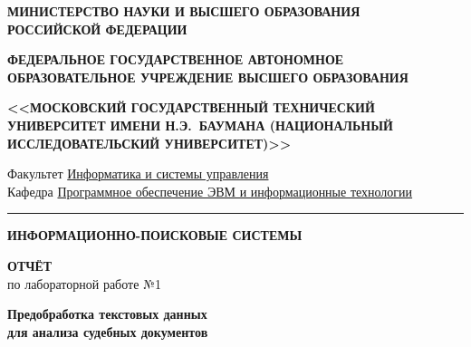 \documentclass[12pt, a4paper]{report}
\begin{document}
\setcounter{chapter}{0}

\begin{titlepage}
\thispagestyle{empty}
\begin{center}

  {\sffamily\small\bfseries МИНИСТЕРСТВО НАУКИ И ВЫСШЕГО ОБРАЗОВАНИЯ\\
  РОССИЙСКОЙ ФЕДЕРАЦИИ}

  \vspace{6pt}
  {\sffamily\small\bfseries ФЕДЕРАЛЬНОЕ ГОСУДАРСТВЕННОЕ АВТОНОМНОЕ\\
  ОБРАЗОВАТЕЛЬНОЕ УЧРЕЖДЕНИЕ ВЫСШЕГО ОБРАЗОВАНИЯ}

  \vspace{8pt}
  {\sffamily\normalsize\bfseries
 <<МОСКОВСКИЙ ГОСУДАРСТВЕННЫЙ ТЕХНИЧЕСКИЙ УНИВЕРСИТЕТ ИМЕНИ Н.Э.~БАУМАНА (НАЦИОНАЛЬНЫЙ ИССЛЕДОВАТЕЛЬСКИЙ УНИВЕРСИТЕТ)>>}

  \vspace{6pt}
  {\sffamily\small Факультет \underline{Информатика и системы управления}}\\[2pt]
  {\sffamily\small Кафедра \underline{Программное обеспечение ЭВМ и информационные технологии}}

  \vspace{10pt}
  \textcolor{SteelBlue}{\rule{\linewidth}{1pt}}
  \vspace{12pt}

  {\sffamily\Large\bfseries\color{NavyBlue}
  ИНФОРМАЦИОННО-ПОИСКОВЫЕ СИСТЕМЫ}

  \vspace{20pt}

  {\sffamily\LARGE\bfseries ОТЧЁТ}\\[6pt]
  {\sffamily\large по лабораторной работе №1}

  \vspace{12pt}
  \begin{tcolorbox}[infobox, title={}]
    \centering\sffamily\large\bfseries\color{NavyBlue}
    Предобработка текстовых данных\\
    для анализа судебных документов
  \end{tcolorbox}

  \vspace{10pt}

\end{center}


\end{titlepage}
\end{document}
